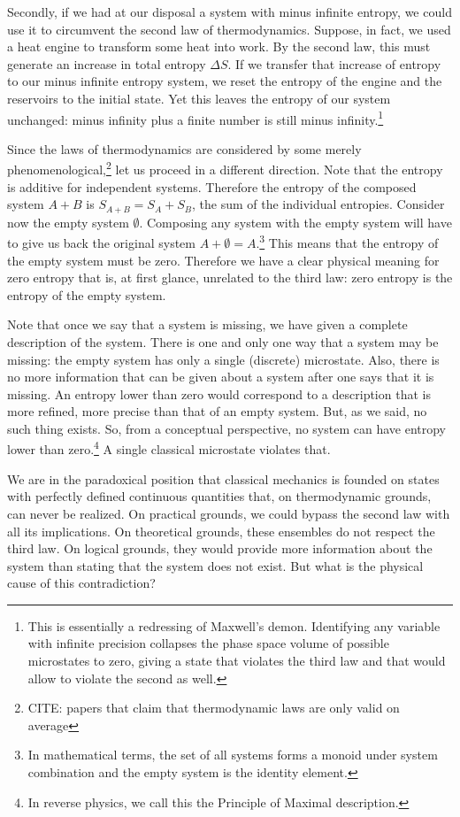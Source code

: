\documentclass[10pt,twocolumn, nofootinbib]{revtex4-2}
\begin{document}
Secondly, if we had at our disposal a system with minus infinite entropy, we could use it to circumvent the second law of thermodynamics. Suppose, in fact, we used a heat engine to transform some heat into work. By the second law, this must generate an increase in total entropy $\Delta S$. If we transfer that increase of entropy to our minus infinite entropy system, we reset the entropy of the engine and the reservoirs to the initial state. Yet this leaves the entropy of our system unchanged: minus infinity plus a finite number is still minus infinity.\footnote{This is essentially a redressing of Maxwell's demon. Identifying any variable with infinite precision collapses the phase space volume of possible microstates to zero, giving a state that violates the third law and that would allow to violate the second as well.}

Since the laws of thermodynamics are considered by some merely phenomenological,\footnote{CITE: papers that claim that thermodynamic laws are only valid on average} let us proceed in a different direction. Note that the entropy is additive for independent systems. Therefore the entropy of the composed system $A+B$ is $S_{A+B} = S_A + S_B$, the sum of the individual entropies. Consider now the empty system $\emptyset$. Composing any system with the empty system will have to give us back the original system $A+\emptyset = A$.\footnote{In mathematical terms, the set of all systems forms a monoid under system combination and the empty system is the identity element.} This means that the entropy of the empty system must be zero. Therefore we have a clear physical meaning for zero entropy that is, at first glance, unrelated to the third law: zero entropy is the entropy of the empty system.

Note that once we say that a system is missing, we have given a complete description of the system. There is one and only one way that a system may be missing: the empty system has only a single (discrete) microstate. Also, there is no more information that can be given about a system after one says that it is missing. An entropy lower than zero would correspond to a description that is more refined, more precise than that of an empty system. But, as we said, no such thing exists. So, from a conceptual perspective, no system can have entropy lower than zero.\footnote{In reverse physics, we call this the Principle of Maximal description.} A single classical microstate violates that.

We are in the paradoxical position that classical mechanics is founded on states with perfectly defined continuous quantities that, on thermodynamic grounds, can never be realized. On practical grounds, we could bypass the second law with all its implications. On theoretical grounds, these ensembles do not respect the third law. On logical grounds, they would provide more information about the system than stating that the system does not exist. But what is the physical cause of this contradiction?
\end{document}
